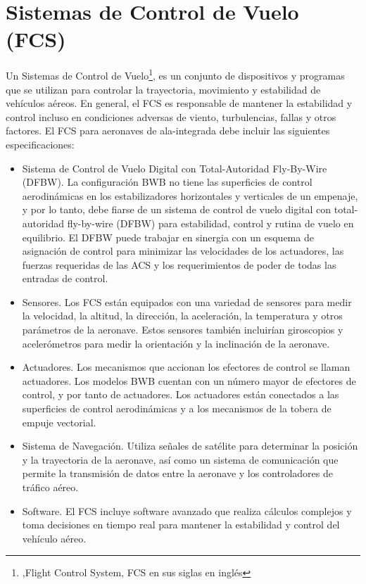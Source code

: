 \section{Sistemas de Control de Vuelo (FCS)}
%
Un Sistemas de Control de Vuelo\footnote{,Flight Control System, FCS en sus siglas en inglés}, es un conjunto de dispositivos y programas que se utilizan para controlar la trayectoria, movimiento y estabilidad de vehículos aéreos. 
%
En general, el FCS es responsable de mantener la estabilidad y control incluso en condiciones adversas de viento, turbulencias, fallas y otros factores. 
%
El FCS para aeronaves de ala-integrada debe incluir las siguientes especificaciones:
\begin{itemize}
    \item  Sistema de Control de Vuelo Digital con Total-Autoridad Fly-By-Wire (DFBW). La configuración BWB no tiene las superficies de control aerodinámicas en los estabilizadores horizontales y verticales de un empenaje, y por lo tanto, debe fiarse de un sistema de control de vuelo digital con total-autoridad fly-by-wire (DFBW) para estabilidad, control y rutina de vuelo en equilibrio. 
    El DFBW puede trabajar en sinergia con un esquema de asignación de control para minimizar las velocidades de los actuadores, las fuerzas requeridas de las ACS y los requerimientos de poder de todas las entradas de control.
    \item Sensores. Los FCS están equipados con una variedad de sensores para medir la velocidad, la altitud, la dirección, la aceleración, la temperatura y otros parámetros de la aeronave. Estos sensores también incluirían giroscopios y acelerómetros para medir la orientación y la inclinación de la aeronave. 
    \item Actuadores. Los mecanismos que accionan los efectores de control se llaman actuadores.  Los modelos BWB cuentan con un número mayor de efectores de control, y por tanto de actuadores. Los actuadores están conectados a las superficies de control aerodinámicas y a los mecanismos de la tobera de empuje vectorial.
    \item Sistema de Navegación. Utiliza señales de satélite para determinar la posición y la trayectoria de la aeronave, así como un sistema de comunicación que permite la transmisión de datos entre la aeronave y los controladores de tráfico aéreo. 
    \item Software. El FCS incluye software avanzado que realiza cálculos complejos y toma decisiones en tiempo real para mantener la estabilidad y control del vehículo aéreo.
\end{itemize}
